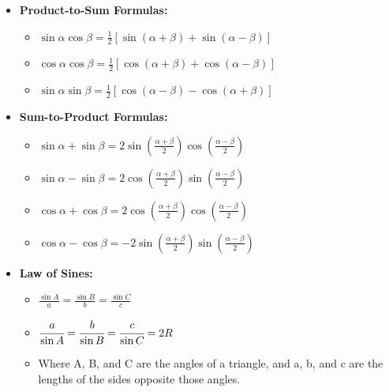 \documentclass[letterpaper,12pt]{article}
\begin{document}
\begin{itemize}
        \item \textbf{Product-to-Sum Formulas:}
            \begin{itemize}
             \item $\sin \alpha \cos \beta = \frac{1}{2} [\sin(\alpha + \beta) + \sin(\alpha - \beta)]$
             \item $\cos \alpha \cos \beta = \frac{1}{2} [\cos(\alpha + \beta) + \cos(\alpha - \beta)]$
             \item $\sin \alpha \sin \beta = \frac{1}{2} [\cos(\alpha - \beta) - \cos(\alpha + \beta)]$
            \end{itemize}
        \item \textbf{Sum-to-Product Formulas:}
            \begin{itemize}
            \item $\sin \alpha + \sin \beta = 2 \sin \left(\frac{\alpha + \beta}{2}\right) \cos \left(\frac{\alpha - \beta}{2}\right)$
            \item $\sin \alpha - \sin \beta = 2 \cos \left(\frac{\alpha + \beta}{2}\right) \sin \left(\frac{\alpha - \beta}{2}\right)$
            \item $\cos \alpha + \cos \beta = 2 \cos \left(\frac{\alpha + \beta}{2}\right) \cos \left(\frac{\alpha - \beta}{2}\right)$
            \item $\cos \alpha - \cos \beta = -2 \sin \left(\frac{\alpha + \beta}{2}\right) \sin \left(\frac{\alpha - \beta}{2}\right)$
        \end{itemize}

        \item \textbf{Law of Sines:}
        \begin{itemize}
            \item $\frac{\sin A}{a} = \frac{\sin B}{b} = \frac{\sin C}{c}$
            \item $\cfrac{a}{\sin A}=\cfrac{b}{\sin B}=\cfrac{c}{\sin C}=2R$
            \item Where A, B, and C are the angles of a triangle, and a, b, and c are the lengths of the sides opposite those angles.
        \end{itemize}
        

\end{itemize}
\end{document}
